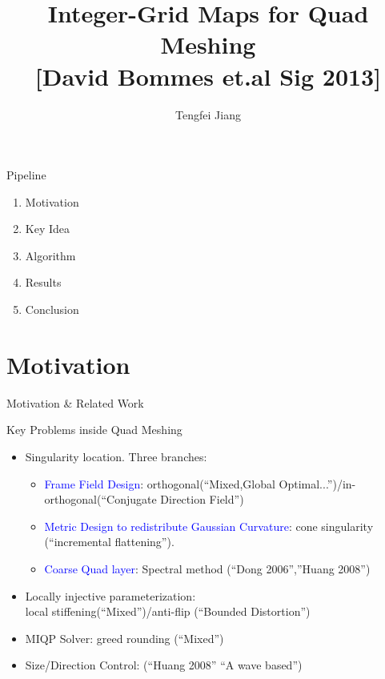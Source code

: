 \documentclass{beamer}
\begin{document}
\title{Integer-Grid Maps for Quad Meshing\\
\small{[David Bommes et.al Sig 2013]}}
\author{Tengfei Jiang}

\newcommand{\FPP}[2]{\frac{\partial #1}{\partial #2}}
\begin{frame}
  \titlepage
\end{frame}

\begin{frame}{Pipeline}
  \begin{enumerate}
    \item Motivation 
    \item Key Idea
    \item Algorithm
    \item Results
    \item Conclusion
  \end{enumerate}
\end{frame}

\section{Motivation}
\begin{frame}{Motivation \& Related Work}
\begin{block}{Key Problems inside Quad Meshing}
\begin{itemize}
\item Singularity location. Three branches:
  \begin{itemize}
    \item \textcolor{blue}{Frame Field Design}: orthogonal(``Mixed,Global Optimal...'')/in-orthogonal(``Conjugate Direction Field'')
    \item \textcolor{blue}{Metric Design to redistribute Gaussian Curvature}: cone singularity (``incremental flattening'').
    \item \textcolor{blue}{Coarse Quad layer}: Spectral method (``Dong 2006'',''Huang 2008'')
  \end{itemize}
\item Locally injective parameterization: \\local stiffening(``Mixed'')/anti-flip (``Bounded Distortion'')
\item MIQP Solver: greed rounding (``Mixed'')
\item Size/Direction Control: (``Huang 2008'' ``A wave based'')
\end{itemize}
\end{block}
\end{frame}
\end{document}
